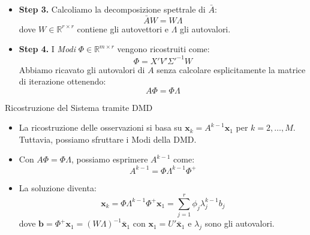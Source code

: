 \documentclass[serif]{beamer}
\newcommand{\R}{\mathbb{R}}
\begin{document}
\begin{frame}
\begin{itemize}
    \item \textbf{Step 3.} Calcoliamo la decomposizione spettrale di \(\bar{A}\): 
    \[
    \bar{A} W = W \Lambda
    \]
    dove \(W \in \R^{r \times r}\) contiene gli autovettori e \(\Lambda\) gli autovalori.

    \item \textbf{Step 4.} I \textit{Modi} \(\Phi \in \R^{m \times r}\) vengono ricostruiti come:
    \[
    \Phi = X' V' \Sigma'^{-1} W
    \]
    Abbiamo ricavato gli autovalori di \(A\) senza calcolare esplicitamente la matrice di iterazione ottenendo:
    \[
    A \Phi = \Phi \Lambda
    \]
\end{itemize}
\end{frame}

\begin{frame}{Ricostruzione del Sistema tramite DMD}
\begin{itemize}
    \item La ricostruzione delle osservazioni si basa su \(\mathbf{x}_k = A^{k-1} \mathbf{x}_1\) per \(k = 2, \dots, M\). Tuttavia, possiamo sfruttare i Modi della DMD. 
    \item Con \(A \Phi = \Phi \Lambda\), possiamo esprimere \(A^{k-1}\) come:
    \[
    A^{k-1} = \Phi \Lambda^{k-1} \Phi^+
    \]
    \item La soluzione diventa:
    \[
    \mathbf{x}_k = \Phi \Lambda^{k-1} \Phi^+ \mathbf{x}_1 = \sum_{j=1}^{r} \phi_j \lambda_j^{k-1} b_j
    \]
    dove \(\mathbf{b} = \Phi^+ \mathbf{x}_1= ({W} {\Lambda})^{-1} \bar{\mathbf{x}}_1 \) con \( \mathbf{x}_1= U' \mathbf{\bar{x}}_1 \) e \(\lambda_j\) sono gli autovalori.
\end{itemize}
\end{frame}
\end{document}
